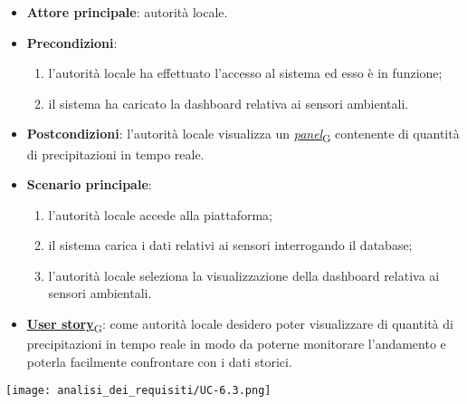 \begin{itemize}
	\item \textbf{Attore principale}: autorità locale.
	\item \textbf{Precondizioni}:
	      \begin{enumerate}
		      \item l'autorità locale ha effettuato l'accesso al sistema ed esso è in funzione;
		      \item il sistema ha caricato la dashboard relativa ai sensori ambientali.
	      \end{enumerate}
	\item \textbf{Postcondizioni}: l'autorità locale visualizza un \href{https://7last.github.io/docs/pb/documentazione-interna/glossario\#panel}{\textit{panel}\textsubscript{G}} contenente di quantità di precipitazioni in tempo reale.
	\item \textbf{Scenario principale}:
	      \begin{enumerate}
		      \item l'autorità locale accede alla piattaforma;
		      \item il sistema carica i dati relativi ai sensori interrogando il database;
		      \item l'autorità locale seleziona la visualizzazione della dashboard relativa ai sensori ambientali.
	      \end{enumerate}
	\item \href{https://7last.github.io/docs/pb/documentazione-interna/glossario\#user-story}{\textbf{User story}\textsubscript{G}}:
	      come autorità locale desidero poter visualizzare di quantità di precipitazioni in tempo reale in modo da poterne monitorare l'andamento
	      e poterla facilmente confrontare con i dati storici.
\end{itemize}
\begin{center}
	\texttt{[image: analisi\_dei\_requisiti/UC-6.3.png]}
\end{center}


